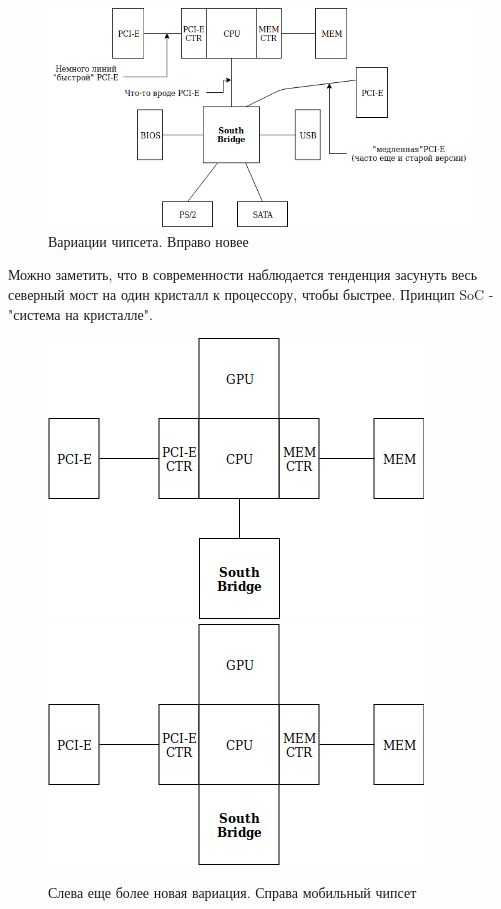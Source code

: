 \documentclass[12pt, a4paper]{article}
\begin{document}
\begin{figure}[h]
    \includegraphics[scale=0.3]{./images/NBSB2.png}
    \caption{Вариации чипсета. Вправо новее}
    \label{fig:CHIPSET0}
\end{figure}
Можно заметить, что в современности наблюдается тенденция засунуть весь северный мост на один кристалл к процессору, чтобы быстрее. Принцип SoC - "система на кристалле".
\begin{figure}[h]
    \centering
    \includegraphics[scale=0.4]{./images/SOC.png}
    \includegraphics[scale=0.4]{./images/Mobile.png}
    \caption{Слева еще более новая вариация. Справа мобильный чипсет}
    \label{fig:CHIPSET1}
\end{figure}
\end{document}
